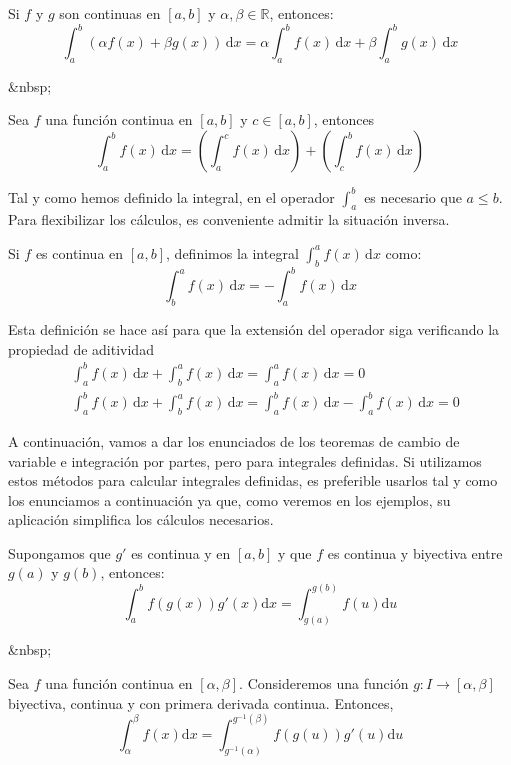 \begin{teorema}
Si $f$ y $g$ son continuas en $[a,b]$ y $\alpha,\beta\in\mathbb{R}$, entonces:
\[
\int_a^b(\alpha f(x)+\beta g(x))\,\mathrm dx=
\alpha\int_a^b f(x)\,\mathrm dx +\beta \int_a^b g(x)\,\mathrm dx
\]
\end{teorema}
\begin{rawhtml}
&nbsp;
\end{rawhtml}
\begin{teorema} Sea $f$ una función continua en $[a,b]$ y
$c\in[a,b]$, entonces
\[
\int_a^b f(x)\,\mathrm dx =\left(\int_a^c f(x)\,\mathrm dx\right)+
\left(\int_c^b f(x)\,\mathrm dx\right)
\]
\end{teorema}
%
Tal y como hemos definido la integral, en el operador $\displaystyle\int_a^b$ es necesario que $a\le b$.
Para flexibilizar los cálculos, es conveniente admitir la situación inversa.
%
\begin{definicion}
Si $f$ es continua en $[a,b]$, definimos la integral
$\displaystyle\int_b^af(x)\,\mathrm dx$ como:
\[
\int_b^a f(x)\,\mathrm dx = -\int_a^b f(x)\,\mathrm dx
\]
\end{definicion}

Esta definición se hace así para que la extensión del operador siga verificando la propiedad de aditividad
\begin{align*}
& \int_a^bf(x)\,\mathrm dx+\int_b^af(x)\,\mathrm dx = \int_a^a f(x)\,\mathrm dx =0\\
& \int_a^bf(x)\,\mathrm dx+\int_b^af(x)\,\mathrm dx = \int_a^bf(x)\,\mathrm dx-\int_a^bf(x)\,\mathrm dx = 0
\end{align*}

A continuación, vamos a dar los enunciados de los teoremas de cambio de variable e integración por partes, pero para integrales definidas.
Si utilizamos estos métodos para calcular integrales definidas, es preferible usarlos tal y como los enunciamos a continuación ya que, como veremos en los ejemplos, su aplicación simplifica los cálculos necesarios.
%
\begin{teorema}\label{th:sust1}
Supongamos que $g'$ es continua y en $[a,b]$ y que $f$ es continua y biyectiva entre $g(a)$ y $g(b)$,
entonces:  
\[
\int_a^bf(g(x))g'(x)\mathrm dx = \int_{g(a)}^{g(b)}f(u)\mathrm du
\]
\end{teorema}
\begin{rawhtml}
&nbsp;
\end{rawhtml}
\begin{corolario}\label{th:sust2}
Sea $f$ una función continua en $[\alpha ,\beta]$.
Consideremos una función $g\colon I\to [\alpha ,\beta]$ biyectiva, continua y con primera derivada continua. Entonces, 
\[
\int_\alpha^\beta f(x)\mathrm dx = 
\int_{g^{-1}(\alpha)}^{g^{-1}(\beta)}f(g(u))g'(u)\mathrm du
\]
\end{corolario}

